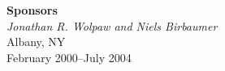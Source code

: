 \begin{titlepage}
\begin{minipage}{\textwidth}
\begin{center}
\begin{minipage}{13cm}
\begin{minipage}[c]{3cm}
  \end{minipage}
\end{minipage}
%
\ifpdf
\\[0.5cm]
\else
\\[1.5cm]
\fi
\textbf{Sponsors} \\
\textit{Jonathan R. Wolpaw and Niels Birbaumer}
\\[1.0cm]
{Albany, NY} \\[1ex]
{February 2000--July 2004}
\end{center}
\end{minipage}
\end{titlepage}

